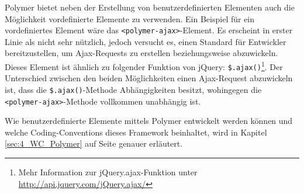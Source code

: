 Polymer bietet neben der Erstellung von benutzerdefinierten Elementen auch die Möglichkeit vordefinierte Elemente zu verwenden. Ein Beispiel für ein vordefiniertes Element wäre das \lstinline|<polymer-ajax>|-Element. Es erscheint in erster Linie als nicht sehr nützlich, jedoch versucht es, einen Standard für Entwickler bereitzustellen, um Ajax-Requests zu erstellen beziehungsweise abzuwickeln. Dieses Element ist ähnlich zu folgender Funktion von jQuery: \lstinline{$.ajax()}\footnote{Mehr Information zur jQuery.ajax-Funktion unter \href{http://api.jquery.com/jQuery.ajax/}{http://api.jquery.com/jQuery.ajax/}}. Der Unterschied zwischen den beiden Möglichkeiten einen Ajax-Request abzuwickeln ist, dass die \lstinline{$.ajax()}-Methode Abhängigkeiten besitzt, wohingegen die \lstinline|<polymer-ajax>|-Methode vollkommen unabhängig ist.

Wie benutzerdefinierte Elemente mittels Polymer entwickelt werden können und welche Coding-Conventions dieses Framework beinhaltet, wird in Kapitel \ref{sec:4_WC_Polymer} auf Seite \pageref{sec:4_WC_Polymer} genauer erläutert.